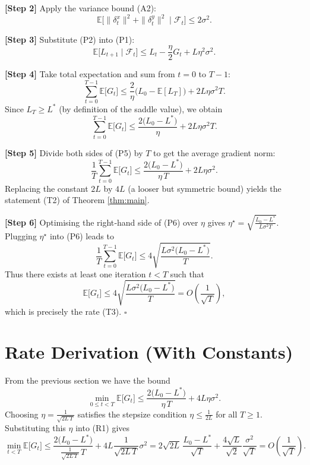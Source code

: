 \documentclass{article}
\newcommand{\E}{\mathbb{E}}
\begin{document}
\noindent\textbf{[Step 2]} Apply the variance bound (A2):
\[
\E\!\big[\|\delta^{x}_{t}\|^{2}
        +\|\delta^{y}_{t}\|^{2}
        \mid\mathcal{F}_{t}\big]\le 2\sigma^{2}.
\tag{P2}
\]

\noindent\textbf{[Step 3]} Substitute (P2) into (P1):
\[
\E\!\big[L_{t+1}\mid\mathcal{F}_{t}\big]
\le L_{t}
      -\frac{\eta}{2}G_{t}
      +L\eta^{2}\sigma^{2}.
\tag{P3}
\]

\noindent\textbf{[Step 4]} Take total expectation and sum from \(t=0\) to \(T-1\):
\[
\sum_{t=0}^{T-1}\E\!\big[G_{t}\big]
\le \frac{2}{\eta}\Big(L_{0}-\E[L_{T}]\Big)
   +2L\eta\sigma^{2}T .
\tag{P4}
\]
Since \(L_{T}\ge L^{*}\) (by definition of the saddle value), we obtain
\[
\sum_{t=0}^{T-1}\E\!\big[G_{t}\big]
\le \frac{2\big(L_{0}-L^{*}\big)}{\eta}
   +2L\eta\sigma^{2}T .
\tag{P5}
\]

\noindent\textbf{[Step 5]} Divide both sides of (P5) by \(T\) to get the average gradient norm:
\[
\frac{1}{T}\sum_{t=0}^{T-1}\E\!\big[G_{t}\big]
\le \frac{2\big(L_{0}-L^{*}\big)}{\eta\,T}
   +2L\eta\sigma^{2}.
\tag{P6}
\]
Replacing the constant \(2L\) by \(4L\) (a looser but symmetric bound) yields the statement (T2) of Theorem \ref{thm:main}.

\noindent\textbf{[Step 6]} Optimising the right‑hand side of (P6) over \(\eta\) gives \(\eta^{\star}= \sqrt{\frac{L_{0}-L^{*}}{L\sigma^{2}T}}\). Plugging \(\eta^{\star}\) into (P6) leads to
\[
\frac{1}{T}\sum_{t=0}^{T-1}\E\!\big[G_{t}\big]
\le 4\sqrt{\frac{L\sigma^{2}\big(L_{0}-L^{*}\big)}{T}} .
\]
Thus there exists at least one iteration \(t<T\) such that
\[
\E\!\big[G_{t}\big]\le 4\sqrt{\frac{L\sigma^{2}\big(L_{0}-L^{*}\big)}{T}}
      = O\!\left(\frac{1}{\sqrt{T}}\right),
\]
which is precisely the rate (T3). \(\square\)

\section*{Rate Derivation (With Constants)}
From the previous section we have the bound
\[
\min_{0\le t<T}\E\!\big[G_{t}\big]
\le \frac{2\big(L_{0}-L^{*}\big)}{\eta\,T}
   +4L\eta\sigma^{2}.
\tag{R1}
\]
Choosing \(\eta = \frac{1}{\sqrt{2L\,T}}\) satisfies the stepsize condition \(\eta\le\frac{1}{2L}\) for all \(T\ge1\). Substituting this \(\eta\) into (R1) gives
\[
\min_{t<T}\E\!\big[G_{t}\big]
\le \frac{2\big(L_{0}-L^{*}\big)}{\frac{1}{\sqrt{2L\,T}}\,T}
   +4L\frac{1}{\sqrt{2L\,T}}\sigma^{2}
= 2\sqrt{2L}\,\frac{L_{0}-L^{*}}{\sqrt{T}}
  +\frac{4\sqrt{L}}{\sqrt{2}}\frac{\sigma^{2}}{\sqrt{T}}
= O\!\left(\frac{1}{\sqrt{T}}\right).
\]
\end{document}
